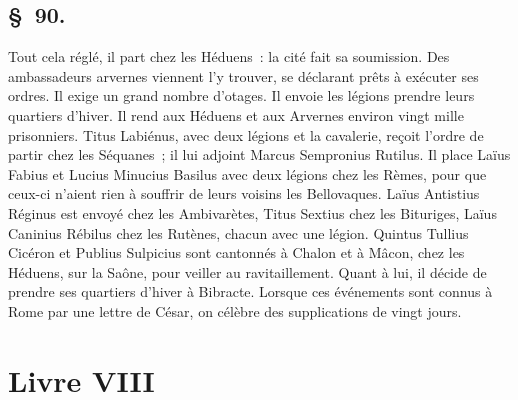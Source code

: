 \documentclass[french,twoside]{book} %
\begin{document}
\subsection[{§ 90.}]{ \textsc{§ 90.} }
\noindent Tout cela réglé, il part chez les Héduens : la cité fait sa soumission. Des ambassadeurs arvernes viennent l’y trouver, se déclarant prêts à exécuter ses ordres. Il exige un grand nombre d’otages. Il envoie les légions prendre leurs quartiers d’hiver. Il rend aux Héduens et aux Arvernes environ vingt mille prisonniers. Titus Labiénus, avec deux légions et la cavalerie, reçoit l’ordre de partir chez les Séquanes ; il lui adjoint Marcus Sempronius Rutilus. Il place Laïus Fabius et Lucius Minucius Basilus avec deux légions chez les Rèmes, pour que ceux-ci n’aient rien à souffrir de leurs voisins les Bellovaques. Laïus Antistius Réginus est envoyé chez les Ambivarètes, Titus Sextius chez les Bituriges, Laïus Caninius Rébilus chez les Rutènes, chacun avec une légion. Quintus Tullius Cicéron et Publius Sulpicius sont cantonnés à Chalon et à Mâcon, chez les Héduens, sur la Saône, pour veiller au ravitaillement. Quant à lui, il décide de prendre ses quartiers d’hiver à Bibracte. Lorsque ces événements sont connus à Rome par une lettre de César, on célèbre des supplications de vingt jours.
 \section[{Livre VIII}]{Livre VIII}\renewcommand{\leftmark}{Livre VIII}
\end{document}

